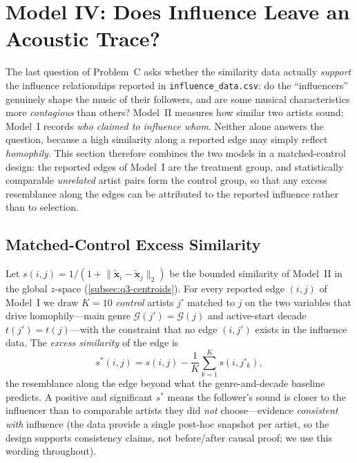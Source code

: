 %

\section{Model IV: Does Influence Leave an Acoustic Trace?}\label{sec:model-q4}

The last question of Problem~C asks whether the similarity data actually
\emph{support} the influence relationships reported in
\texttt{influence\_data.csv}: do the ``influencers'' genuinely shape the
music of their followers, and are some musical characteristics more
\emph{contagious} than others? Model~II measures how similar two artists
sound; Model~I records \emph{who claimed to influence whom}. Neither
alone answers the question, because a high similarity along a reported
edge may simply reflect \emph{homophily}. This section therefore
combines the two models in a matched-control design: the reported edges
of Model~I are the treatment group, and statistically comparable
\emph{unrelated} artist pairs form the control group, so that any
excess resemblance along the edges can be attributed to the reported
influence rather than to selection.

\subsection{Matched-Control Excess Similarity}\label{subsec:q4-design}

Let $s(i,j)=1/(1+\lVert\tilde{\mathbf{x}}_i-\tilde{\mathbf{x}}_j\rVert_2)$
be the bounded similarity of Model~II in the global $z$-space
(\cref{subsec:q3-centroids}). For every reported edge $(i,j)$ of
Model~I we draw $K=10$ \emph{control} artists $j'$ matched to $j$ on the
two variables that drive homophily---main genre $\mathcal{G}(j')=
\mathcal{G}(j)$ and active-start decade $t(j')=t(j)$---with the
constraint that no edge $(i,j')$ exists in the influence data. The
\emph{excess similarity} of the edge is
\begin{equation}\label{eq:q4-excess}
s^{*}(i,j)=s(i,j)-\frac{1}{K}\sum_{k=1}^{K}s(i,j'_k),
\end{equation}
the resemblance along the edge beyond what the genre-and-decade baseline
predicts. A positive and significant $s^{*}$ means the follower's sound
is closer to the influencer than to comparable artists they did
\emph{not} choose---evidence \emph{consistent with} influence (the data
provide a single post-hoc snapshot per artist, so the design supports
consistency claims, not before/after causal proof; we use this wording
throughout).

